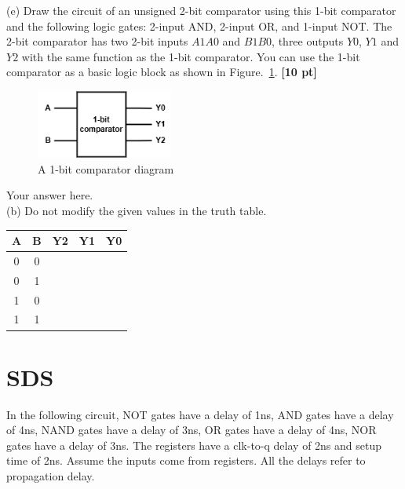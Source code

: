 \documentclass[a4paper]{article}
\begin{document}
(e) Draw the circuit of an unsigned 2-bit comparator using this 1-bit comparator and the following logic gates: 2-input AND, 2-input OR, and 1-input NOT. The 2-bit comparator has two 2-bit inputs $A1A0$ and $B1B0$, three outputs $Y0$, $Y1$ and $Y2$ with the same function as the 1-bit comparator. You can use the 1-bit comparator as a basic logic block as shown in Figure.~\ref{fig:Q1_comparator_1}. \textbf{[10 pt]}
\begin{figure}[htbp]
    \centering
    \includegraphics[width=0.4\textwidth]{Q1_comparator_1.png}
    \caption{A 1-bit comparator diagram}
    \label{fig:Q1_comparator_1}
\end{figure}
\begin{answer}[Question 1]
    Your answer here.\\
    (b) Do not modify the given values in the truth table.\\
    \begin{center}
        \begin{tabular}{ |c|c||c|c|c| }
            \hline
            A & B & Y2 & Y1 & Y0 \\
            \hline
            0 & 0 &    &    &    \\
            \hline
            0 & 1 &    &    &    \\
            \hline
            1 & 0 &    &    &    \\
            \hline
            1 & 1 &    &    &    \\
            \hline
        \end{tabular}
    \end{center}
\end{answer}

\newpage
\section{SDS}
In the following circuit, NOT gates have a delay of 1ns, AND gates have a delay of 4ns, NAND gates have a delay of 3ns, OR gates have a delay of 4ns, NOR gates have a delay of 3ns. The registers have a clk-to-q delay of 2ns and setup time of 2ns. Assume the inputs
come from registers. All the delays refer to propagation delay.\\
\end{document}
